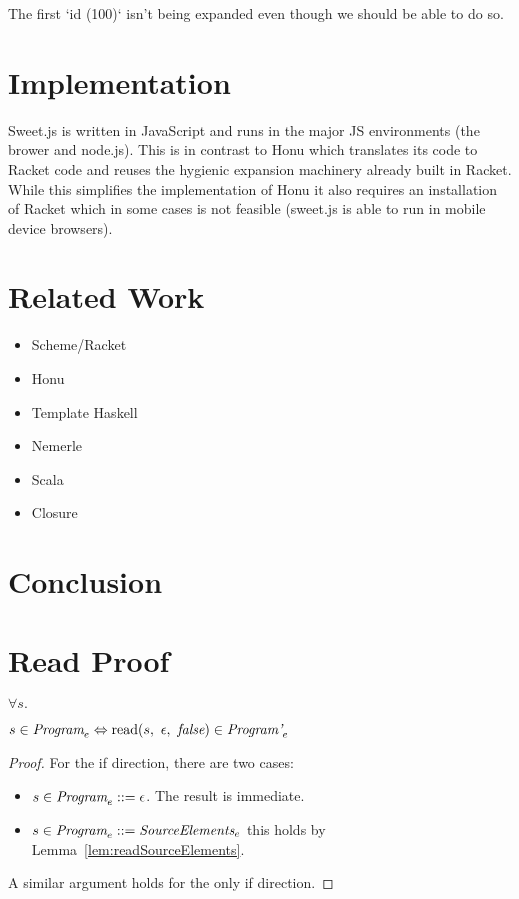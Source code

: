 \documentclass[onecolumn]{sigplanconf-onecolumn}
\begin{document}
The first `id (100)` isn't being expanded even though we should be
able to do so.



\section{Implementation}
\label{sec-6}
Sweet.js is written in JavaScript and runs in the major JS
environments (\ie the brower and node.js). This is in contrast to Honu
which translates its code to Racket code and reuses the hygienic
expansion machinery already built in Racket. While this simplifies
the implementation of Honu it also requires an installation of Racket
which in some cases is not feasible (\eg sweet.js is able to run in
mobile device browsers).
\section{Related Work}
\label{sec-7}

\begin{itemize}
\item Scheme/Racket
\item Honu
\item Template Haskell
\item Nemerle
\item Scala
\item Closure
\end{itemize}
\section{Conclusion}
\label{sec-8}

\appendix

\clearpage

\section{Read Proof}

\begin{theorem}\mbox{}

  \( \forall s. \)

  \( s \in \textit{Program}_{e} \Leftrightarrow 
  \textrm{read}(s,~\epsilon,~\textit{false}) \in \textit{Program'}_{e} \)

\end{theorem}
\begin{proof}

  For the if direction, there are two cases:
  \begin{itemize}
  \item \( s \in \textit{Program}_{e} ::= \epsilon \). The result is immediate.

  \item \( s \in \textit{Program}_{e} ::= \textit{SourceElements}_{e} \)
    this holds by Lemma~\ref{lem:readSourceElements}.
  \end{itemize}

  A similar argument holds for the only if direction.
\end{proof}
\end{document}
